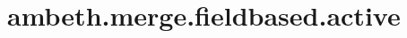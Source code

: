 \section{ambeth.merge.fieldbased.active}
\label{configuration:AmbethMergeFieldbasedActive}
\AvailableInJavaAndCsharp{\TODO}